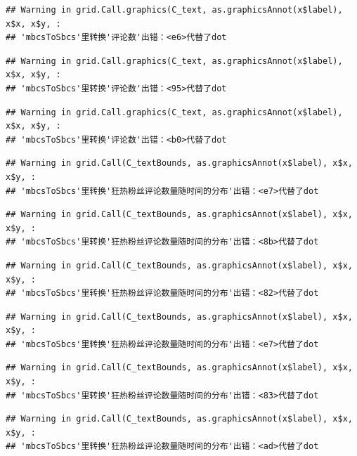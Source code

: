 \documentclass[
]{article}
\begin{document}
\begin{verbatim}
## Warning in grid.Call.graphics(C_text, as.graphicsAnnot(x$label), x$x, x$y, :
## 'mbcsToSbcs'里转换'评论数'出错：<e6>代替了dot
\end{verbatim}

\begin{verbatim}
## Warning in grid.Call.graphics(C_text, as.graphicsAnnot(x$label), x$x, x$y, :
## 'mbcsToSbcs'里转换'评论数'出错：<95>代替了dot
\end{verbatim}

\begin{verbatim}
## Warning in grid.Call.graphics(C_text, as.graphicsAnnot(x$label), x$x, x$y, :
## 'mbcsToSbcs'里转换'评论数'出错：<b0>代替了dot
\end{verbatim}

\begin{verbatim}
## Warning in grid.Call(C_textBounds, as.graphicsAnnot(x$label), x$x, x$y, :
## 'mbcsToSbcs'里转换'狂热粉丝评论数量随时间的分布'出错：<e7>代替了dot
\end{verbatim}

\begin{verbatim}
## Warning in grid.Call(C_textBounds, as.graphicsAnnot(x$label), x$x, x$y, :
## 'mbcsToSbcs'里转换'狂热粉丝评论数量随时间的分布'出错：<8b>代替了dot
\end{verbatim}

\begin{verbatim}
## Warning in grid.Call(C_textBounds, as.graphicsAnnot(x$label), x$x, x$y, :
## 'mbcsToSbcs'里转换'狂热粉丝评论数量随时间的分布'出错：<82>代替了dot
\end{verbatim}

\begin{verbatim}
## Warning in grid.Call(C_textBounds, as.graphicsAnnot(x$label), x$x, x$y, :
## 'mbcsToSbcs'里转换'狂热粉丝评论数量随时间的分布'出错：<e7>代替了dot
\end{verbatim}

\begin{verbatim}
## Warning in grid.Call(C_textBounds, as.graphicsAnnot(x$label), x$x, x$y, :
## 'mbcsToSbcs'里转换'狂热粉丝评论数量随时间的分布'出错：<83>代替了dot
\end{verbatim}

\begin{verbatim}
## Warning in grid.Call(C_textBounds, as.graphicsAnnot(x$label), x$x, x$y, :
## 'mbcsToSbcs'里转换'狂热粉丝评论数量随时间的分布'出错：<ad>代替了dot
\end{verbatim}
\end{document}
